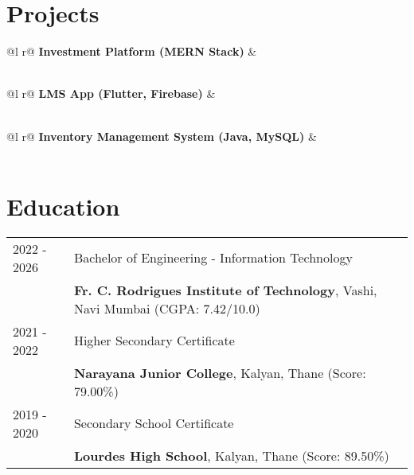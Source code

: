 \documentclass[a4paper,12pt]{article}
\begin{document}
\section{Projects}

\begin{tabularx}{\linewidth}{ @{}l r@{} }
\textbf{Investment Platform (MERN Stack)} & \hfill \href{https://github.com/richiebthomas}{\faGithub} \\[3.75pt]
 \\
\end{tabularx}

\begin{tabularx}{\linewidth}{ @{}l r@{} }
\textbf{LMS App (Flutter, Firebase)} & \hfill \href{https://github.com/richiebthomas}{\faGithub} \\[3.75pt]
 \\
\end{tabularx}

\begin{tabularx}{\linewidth}{ @{}l r@{} }
\textbf{Inventory Management System (Java, MySQL)} & \hfill \href{https://github.com/richiebthomas}{\faGithub} \\[3.75pt]
 \\
\end{tabularx}

\section{Education}
\begin{tabularx}{\linewidth}{@{}l X@{}}	
2022 - 2026 & Bachelor of Engineering - Information Technology \\
& \textbf{Fr. C. Rodrigues Institute of Technology}, Vashi, Navi Mumbai \hfill \normalsize (CGPA: 7.42/10.0) \\[5pt]

2021 - 2022 & Higher Secondary Certificate \\
& \textbf{Narayana Junior College}, Kalyan, Thane \hfill (Score: 79.00\%) \\[5pt]

2019 - 2020 & Secondary School Certificate \\
& \textbf{Lourdes High School}, Kalyan, Thane \hfill (Score: 89.50\%) \\
\end{tabularx}
\end{document}
